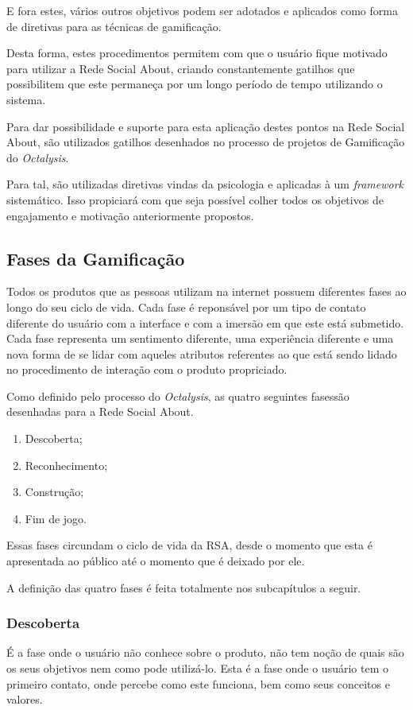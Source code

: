 E fora
estes, vários outros  objetivos podem ser adotados e aplicados como forma
de diretivas para as técnicas de gamificação.

Desta forma, estes procedimentos permitem com que o usuário fique motivado
para utilizar a Rede Social About, criando constantemente gatilhos que possibilitem
que este permaneça por um longo período de tempo utilizando o sistema.

Para dar possibilidade e suporte para esta aplicação destes pontos na Rede
Social About, são utilizados gatilhos desenhados no processo de projetos
de Gamificação do \textit{Octalysis}.

Para tal, são utilizadas diretivas vindas da psicologia e aplicadas à um
\textit{framework} sistemático. Isso propiciará com que seja possível colher
todos os objetivos de engajamento e motivação anteriormente propostos.

\subsection{Fases da Gamificação}
\label{sub:fasesgamifição}
Todos os produtos que as pessoas utilizam na internet possuem diferentes
fases ao longo do seu ciclo de vida. Cada fase é reponsável por um tipo de contato diferente 
do usuário com a interface e com a imersão em que este está submetido.
Cada fase representa um sentimento diferente, uma experiência diferente
e uma nova forma de se lidar com aqueles atributos referentes ao que está
sendo lidado no procedimento de interação com o produto propriciado.

Como definido pelo processo do \textit{Octalysis}, as quatro seguintes fasessão 
desenhadas para a Rede Social About.

\begin{enumerate}
    \item Descoberta;
    \item Reconhecimento;
    \item Construção;
    \item Fim de jogo.
\end{enumerate}

Essas fases circundam o ciclo de vida da RSA, desde o momento que esta
é apresentada ao público até o momento que é deixado por ele. 

A definição das quatro fases é feita totalmente nos subcapítulos a seguir.

\subsubsection{Descoberta}
\label{sub:descoperta}
É a fase onde o usuário não conhece sobre o produto, não tem noção de quais são os
seus objetivos nem como pode utilizá-lo. Esta é a fase onde o usuário tem o primeiro
contato, onde percebe como este funciona, bem como seus conceitos e valores.

